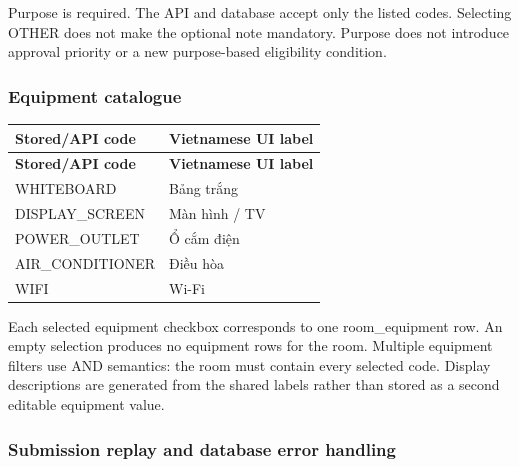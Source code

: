 Purpose is required. The API and database accept only the listed codes. Selecting OTHER does not make the optional note mandatory. Purpose does not introduce approval priority or a new purpose-based eligibility condition.\par

\subsubsection{Equipment catalogue}

\begin{longtable}{|p{}|p{}|}

\hline

\textbf{Stored/\allowbreak{}API code} & \textbf{Vietnamese UI label} \\ \hline

\endfirsthead

\hline

\textbf{Stored/\allowbreak{}API code} & \textbf{Vietnamese UI label} \\ \hline

\endhead

WHITEBOARD & Bảng trắng \\ \hline

DISPLAY\_\allowbreak{}SCREEN & Màn hình /\allowbreak{} TV \\ \hline

POWER\_\allowbreak{}OUTLET & Ổ cắm điện \\ \hline

AIR\_\allowbreak{}CONDITIONER & Điều hòa \\ \hline

WIFI & Wi-\allowbreak{}Fi \\ \hline

\end{longtable}

\vspace{2mm}

Each selected equipment checkbox corresponds to one room\_equipment row. An empty selection produces no equipment rows for the room. Multiple equipment filters use AND semantics: the room must contain every selected code. Display descriptions are generated from the shared labels rather than stored as a second editable equipment value.\par

\subsubsection{Submission replay and database error handling}

